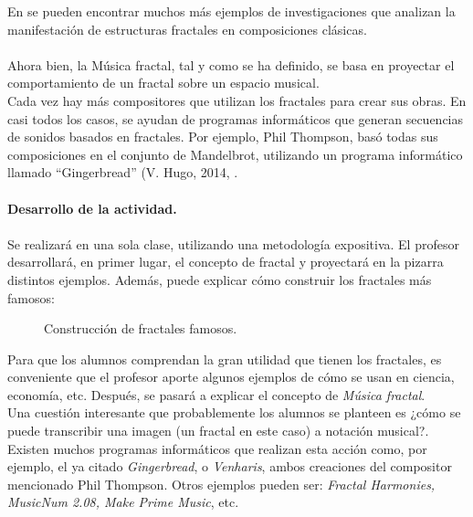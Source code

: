 \documentclass[a4paper, openright, 11pt, titlepage]{report}
\theoremstyle{definition}\newtheorem{defin}[propo]{Definition}
\theoremstyle{definition}\newtheorem{obser}[propo]{Remark}
\theoremstyle{definition}\newtheorem{ejem}[propo]{Ejemplo}
\theoremstyle{definition}\newtheorem{algoritmo}[propo]{Algoritmo}
\begin{document}
\begin{itemize}
    En \cite{fractales} se pueden encontrar muchos más ejemplos de investigaciones que analizan la manifestación de estructuras fractales en composiciones clásicas.\\\\
    Ahora bien, la Música fractal, tal y como se ha definido, se basa en proyectar el comportamiento de un fractal sobre un espacio musical.\\
    Cada vez hay más compositores que utilizan los fractales para crear sus obras. En casi todos los casos, se ayudan de programas informáticos que generan secuencias de sonidos basados en fractales. Por ejemplo, Phil Thompson, basó todas sus composiciones en el conjunto de Mandelbrot, utilizando un programa informático llamado ``Gingerbread'' (V. Hugo, 2014, \cite{gingerbread}.\\\\
    \textbf{Desarrollo de la actividad.}\\\\
    Se realizará en una sola clase, utilizando una metodología expositiva. El profesor desarrollará, en primer lugar, el concepto de fractal y proyectará en la pizarra distintos ejemplos. Además, puede explicar cómo construir los fractales más famosos:
    \begin{figure}[H]
        \centering
         \hspace{1.7cm}
        \caption{Construcción de fractales famosos. \cite{triangulo}}
    \end{figure}
\end{itemize}
Para que los alumnos comprendan la gran utilidad que tienen los fractales, es conveniente que el profesor aporte algunos ejemplos de cómo se usan en ciencia, economía, etc. Después, se pasará a explicar el concepto de \textit{Música fractal}. \\
Una cuestión interesante que probablemente los alumnos se planteen es ¿cómo se puede transcribir una imagen (un fractal en este caso) a notación musical?. Existen muchos programas informáticos que realizan esta acción como, por ejemplo, el ya citado \textit{Gingerbread}, o \textit{Venharis}, ambos creaciones del compositor mencionado Phil Thompson. Otros ejemplos pueden ser: \textit{Fractal Harmonies, MusicNum 2.08, Make Prime Music}, etc.\\
\end{document}
